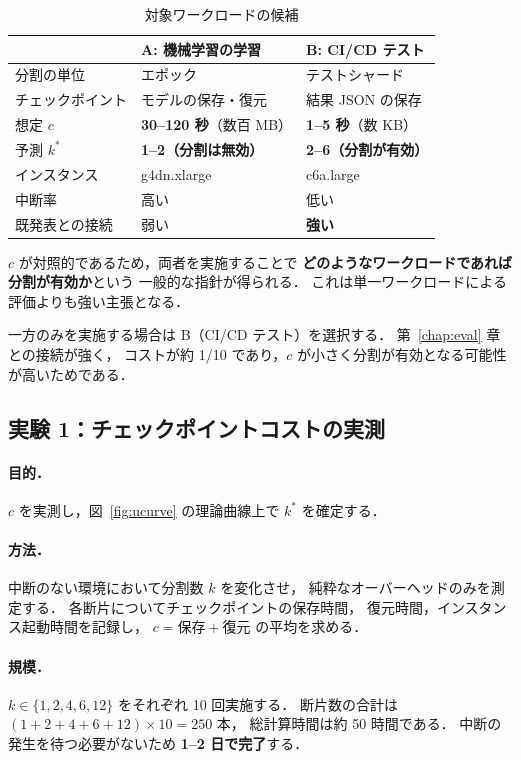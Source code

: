 \documentclass[11pt,a4paper]{ltjsreport}
\begin{document}
\begin{table}[htbp]
\centering
\caption{対象ワークロードの候補}
\label{tab:usecases}
\small
\begin{tabularx}{\textwidth}{@{}lXX@{}}
\toprule
 & \textbf{A: 機械学習の学習} & \textbf{B: CI/CD テスト} \\
\midrule
分割の単位   & エポック & テストシャード \\
チェックポイント & モデルの保存・復元 & 結果 JSON の保存 \\
想定 $c$     & \textbf{30--120 秒}（数百 MB） & \textbf{1--5 秒}（数 KB） \\
予測 $k^{*}$ & \textbf{1--2（分割は無効）} & \textbf{2--6（分割が有効）} \\
インスタンス & g4dn.xlarge & c6a.large \\
中断率       & 高い & 低い \\
既発表との接続 & 弱い & \textbf{強い} \\
\bottomrule
\end{tabularx}
\end{table}

$c$ が対照的であるため，両者を実施することで
\textbf{どのようなワークロードであれば分割が有効か}という
一般的な指針が得られる．
これは単一ワークロードによる評価よりも強い主張となる．

一方のみを実施する場合は B（CI/CD テスト）を選択する．
第~\ref{chap:eval} 章との接続が強く，
コストが約 1/10 であり，$c$ が小さく分割が有効となる可能性が高いためである．

\subsection{実験 1：チェックポイントコストの実測}

\paragraph{目的．}
$c$ を実測し，図~\ref{fig:ucurve} の理論曲線上で
$k^{*}$ を確定する．

\paragraph{方法．}
中断のない環境において分割数 $k$ を変化させ，
純粋なオーバーヘッドのみを測定する．
各断片についてチェックポイントの保存時間，
復元時間，インスタンス起動時間を記録し，
$c = \text{保存} + \text{復元}$ の平均を求める．

\paragraph{規模．}
$k \in \{1,2,4,6,12\}$ をそれぞれ 10 回実施する．
断片数の合計は $(1+2+4+6+12)\times 10 = 250$ 本，
総計算時間は約 50 時間である．
中断の発生を待つ必要がないため \textbf{1--2 日で完了}する．
\end{document}
